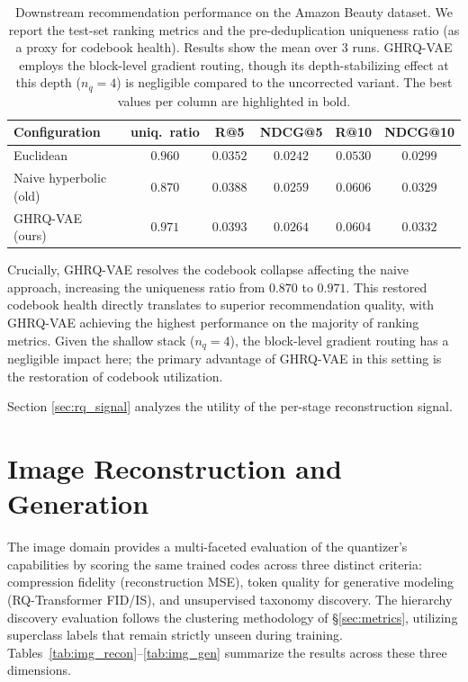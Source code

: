 \documentclass[12pt]{report}
\begin{document}
\begin{table}[h]
\centering
\caption{Downstream recommendation performance on the Amazon Beauty dataset. We report the test-set ranking metrics and the pre-deduplication uniqueness ratio (as a proxy for codebook health). Results show the mean over 3 runs. GHRQ-VAE employs the block-level gradient routing, though its depth-stabilizing effect at this depth ($n_q=4$) is negligible compared to the uncorrected variant. The best values per column are highlighted in bold.}
\label{tab:rec_beauty}
\begin{tabular}{lccccc}
\hline
Configuration & uniq.\ ratio & R@5 & NDCG@5 & R@10 & NDCG@10 \\
\hline
Euclidean & $0.960$ & $0.0352$ & $0.0242$ & $0.0530$ & $0.0299$ \\
Naive hyperbolic (old) & $0.870$ & $0.0388$ & $0.0259$ & $\mathbf{0.0606}$ & $0.0329$ \\
GHRQ-VAE (ours) & $\mathbf{0.971}$ & $\mathbf{0.0393}$ & $\mathbf{0.0264}$ & $0.0604$ & $\mathbf{0.0332}$ \\
\hline
\end{tabular}
\end{table}

Crucially, GHRQ-VAE resolves the codebook collapse affecting the naive approach, increasing the uniqueness ratio from $0.870$ to $0.971$. This restored codebook health directly translates to superior recommendation quality, with GHRQ-VAE achieving the highest performance on the majority of ranking metrics. Given the shallow stack ($n_q=4$), the block-level gradient routing has a negligible impact here; the primary advantage of GHRQ-VAE in this setting is the restoration of codebook utilization.

Section \ref{sec:rq_signal} analyzes the utility of the per-stage reconstruction signal.

\section{Image Reconstruction and Generation}
\label{sec:exp_image}

The image domain provides a multi-faceted evaluation of the quantizer's capabilities by scoring the same trained codes across three distinct criteria: compression fidelity (reconstruction MSE), token quality for generative modeling (RQ-Transformer FID/IS), and unsupervised taxonomy discovery. The hierarchy discovery evaluation follows the clustering methodology of \S\ref{sec:metrics}, utilizing superclass labels that remain strictly unseen during training. Tables~\ref{tab:img_recon}--\ref{tab:img_gen} summarize the results across these three dimensions.
\end{document}
